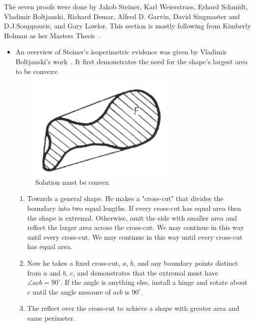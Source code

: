 \documentclass[a4paper]{book}
\numberwithin{theorem}{section}%
\begin{document}
The seven proofs were done by Jakob Steiner, Karl Weierstrass, Erhard Schmidt, Vladimir Boltjanski, Richard Demar, Alfred D. Garvin, David Singmaster and D.J.Souppouris, and Gary Lawlor. This section is mostly following from Kimberly Holman as her Masters Thesis~\citep{holman2022isoperimetric}.
\begin{itemize}
    \item An overview of Steiner's isoperimetric evidence was given by Vladimir Boltjanski's work~\citep{boltjansky1985geometry}. It first demonstrates the need for the shape's largest area to be convexv. 
    \begin{figure}[hbt!]
        \begin{center}   
            \includegraphics[width=70mm]{Boltjanski1}
            \caption{Solution must be convex}
        \end{center}
    \end{figure}
    \begin{enumerate}
        \item Towards a general shape. He makes a "cross-cut" that divides the boundary into two equal lengths. If every cross-cut has equal area then the shape is extremal. Otherwise, omit the side with smaller area and reflect the larger area across the cross-cut. We may continue in this way until every cross-cut. We may continue in this way until every cross-cut has equal area.
        \item Now  he takes a fixed cross-cut, $a$, $b$, and any boundary points distinct from $a$ and $b$, $c$, and demonstrates that the extremal must have $\angle acb=90^{\circ}$. If the angle is anything else, install a hinge and rotate about $c$ until the angle mesaure of $acb$ is $90^{\circ}$.
        \item The reflect over the cross-cut to achieve a shape with greater area and same perimeter.
    \end{enumerate}


\end{itemize}
\end{document}
